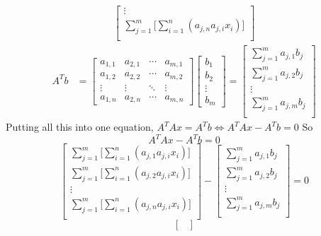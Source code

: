 \documentclass{article}
\begin{document}
\begin{enumerate}
{\begin{align*}
\begin{bmatrix}
        \vdots \\
        \sum_{j=1}^m \Bigg[ \sum_{i=1}^n (a_{j,n}a_{j,i} x_{i}) \Bigg]\\
    \end{bmatrix}
    \end{align*}
    \begin{align*}
        A^Tb &= 
    \begin{bmatrix}
        a_{1,1} & a_{2,1} & \cdots & a_{m,1} \\
        a_{1,2} & a_{2,2} & \cdots & a_{m,2} \\
        \vdots  & \vdots  & \ddots & \vdots  \\
        a_{1,n} & a_{2,n} & \cdots & a_{m,n} 
    \end{bmatrix}
    \begin{bmatrix}
        b_{1} \\
        b_{2} \\
        \vdots \\
        b_{m}
    \end{bmatrix} = 
    \begin{bmatrix}
        \sum_{j=1}^m a_{j,1}b_j \\
        \sum_{j=1}^m a_{j,2}b_j \\
        \vdots \\
        \sum_{j=1}^m a_{j,m}b_j\\
    \end{bmatrix}
    \end{align*}
    Putting all this into one equation, $A^TAx = A^Tb \iff A^TAx - A^Tb = 0$
    So 
    \[A^TAx - A^Tb = 0\]
    \[ \begin{bmatrix}
        \sum_{j=1}^m \Bigg[ \sum_{i=1}^n (a_{j,1}a_{j,i} x_{i}) \Bigg]\\
        \sum_{j=1}^m \Bigg[ \sum_{i=1}^n (a_{j,2}a_{j,i} x_{i}) \Bigg]\\
        \vdots \\
        \sum_{j=1}^m \Bigg[ \sum_{i=1}^n (a_{j,n}a_{j,i} x_{i}) \Bigg]\\
    \end{bmatrix} - 
    \begin{bmatrix}
        \sum_{j=1}^m a_{j,1}b_j \\
        \sum_{j=1}^m a_{j,2}b_j \\
        \vdots \\
        \sum_{j=1}^m a_{j,m}b_j\\
    \end{bmatrix}
    = 0\]
    \[ \begin{bmatrix}

\end{bmatrix}\]}
\end{enumerate}
\end{document}
